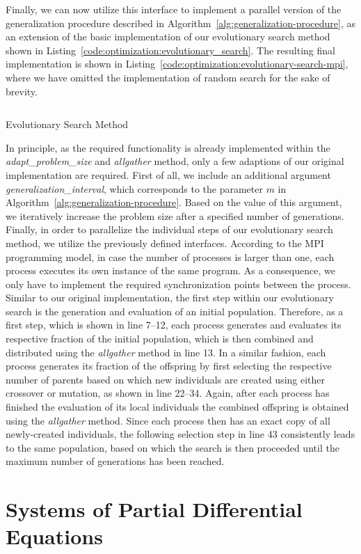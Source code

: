 Finally, we can now utilize this interface to implement a parallel version of the generalization procedure described in Algorithm~\ref{alg:generalization-procedure}, as an extension of the basic implementation of our evolutionary search method shown in Listing~\ref{code:optimization:evolutionary_search}.
The resulting final implementation is shown in Listing~\ref{code:optimization:evolutionary-search-mpi}, where we have omitted the implementation of random search for the sake of brevity.
\begin{listing}
	\inputminted[linenos]{python}{evostencils/optimization/evolutionary_search_mpi.py}
	\caption{Evolutionary Search Method}
	\label{code:optimization:evolutionary-search-mpi}
\end{listing}
In principle, as the required functionality is already implemented within the \emph{adapt\_problem\_size} and \emph{allgather} method, only a few adaptions of our original implementation are required.
First of all, we include an additional argument \emph{generalization\_interval}, which corresponds to the parameter $m$ in Algorithm~\ref{alg:generalization-procedure}.
Based on the value of this argument, we iteratively increase the problem size after a specified number of generations.
Finally, in order to parallelize the individual steps of our evolutionary search method, we utilize the previously defined interfaces.
According to the MPI programming model, in case the number of processes is larger than one, each process executes its own instance of the same program.
As a consequence, we only have to implement the required synchronization points between the process.
Similar to our original implementation, the first step within our evolutionary search is the generation and evaluation of an initial population.
Therefore, as a first step, which is shown in line 7--12, each process generates and evaluates its respective fraction of the initial population, which is then combined and distributed using the \emph{allgather} method in line 13.
In a similar fashion, each process generates its fraction of the offspring by first selecting the respective number of parents based on which new individuals are created using either crossover or mutation, as shown in line 22--34.
Again, after each process has finished the evaluation of its local individuals the combined offspring is obtained using the \emph{allgather} method.
Since each process then has an exact copy of all newly-created individuals, the following selection step in line 43 consistently leads to the same population, based on which the search is then proceeded until the maximum number of generations has been reached.

\section{Systems of Partial Differential Equations}